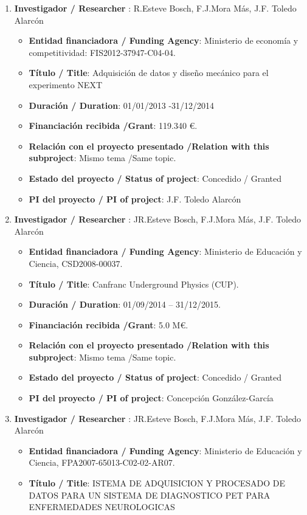 \begin{enumerate}
\item {\bf Investigador / Researcher }: R.Esteve Bosch, F.J.Mora Más, J.F. Toledo Alarcón
\begin{itemize}
\item {\bf Entidad financiadora / Funding Agency}: Ministerio de economía y competitividad: FIS2012-37947-C04-04.
\item {\bf Título / Title}:  Adquisición de datos y diseño mecánico para el experimento NEXT
\item {\bf Duración / Duration}: 01/01/2013 -31/12/2014
\item {\bf Financiación recibida /Grant}: 119.340 \euro. 
\item {\bf Relación con el proyecto presentado /Relation with this subproject}: Mismo tema /Same topic. 
\item {\bf Estado del proyecto / Status of project}: Concedido / Granted
\item {\bf PI del proyecto / PI of project}: J.F. Toledo Alarcón
\end{itemize}
\item {\bf Investigador / Researcher }: JR.Esteve Bosch, F.J.Mora Más, J.F. Toledo Alarcón
\begin{itemize}
\item {\bf Entidad financiadora / Funding Agency}: Ministerio de Educaci\'on y Ciencia, CSD2008-00037.
\item {\bf Título / Title}:  Canfranc Underground Physics (CUP).
\item {\bf Duración / Duration}: 01/09/2014 -- 31/12/2015. 
\item {\bf Financiación recibida /Grant}: 5.0 M\euro. 
\item {\bf Relación con el proyecto presentado /Relation with this subproject}: Mismo tema /Same topic. 
\item {\bf Estado del proyecto / Status of project}: Concedido / Granted
\item {\bf PI del proyecto / PI of project}: Concepción González-García 
\end{itemize}
\item {\bf Investigador / Researcher }: JR.Esteve Bosch, F.J.Mora Más, J.F. Toledo Alarcón
\begin{itemize}
\item {\bf Entidad financiadora / Funding Agency}: Ministerio de Educaci\'on y Ciencia, FPA2007-65013-C02-02-AR07.
\item {\bf Título / Title}:  ISTEMA DE ADQUISICION Y PROCESADO DE DATOS PARA UN SISTEMA DE DIAGNOSTICO PET PARA ENFERMEDADES NEUROLOGICAS

\end{itemize}
\end{enumerate}

